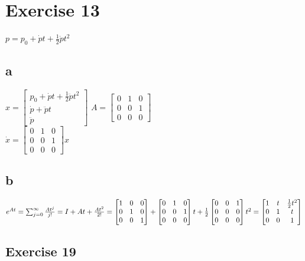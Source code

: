 \documentclass{article}
\begin{document}
\section*{Exercise 13}
$p=p_0+\dot{p}t+\frac{1}{2}\ddot{p}t^2$
\subsection*{a}
$x = \begin{bmatrix}
    p_0 + \dot{p}t + \frac{1}{2}\ddot{p}t^2 \\
    \dot{p} + \ddot{p}t \\
    \ddot{p}
\end{bmatrix}$
\quad
$A=\begin{bmatrix}
    0 & 1 & 0 \\
    0 & 0 & 1 \\
    0 & 0 & 0
\end{bmatrix}$
\\
$\dot{x}=\begin{bmatrix}
    0 & 1 & 0 \\
    0 & 0 & 1 \\
    0 & 0 & 0
\end{bmatrix}x$
\subsection*{b}
$e^{At}=\sum_{j=0}^{\infty}\frac{At^{j}}{j!}=I+At+\frac{At^2}{2!}=
\begin{bmatrix}
    1 & 0 & 0 \\
    0 & 1 & 0 \\
    0 & 0 & 1
\end{bmatrix}+\begin{bmatrix}
    0 & 1 & 0 \\
    0 & 0 & 1 \\
    0 & 0 & 0
\end{bmatrix}t+\frac{1}{2}
\begin{bmatrix}
    0 & 0 & 1 \\
    0 & 0 & 0 \\
    0 & 0 & 0
\end{bmatrix}t^2 \\
= \begin{bmatrix}
    1 & t & \frac{1}{2}t^2 \\
    0 & 1 & t \\
    0 & 0 & 1
\end{bmatrix}$ 
\subsection*{Exercise 19}
\end{document}

